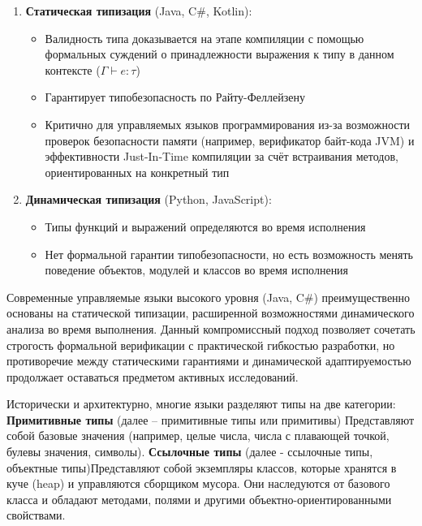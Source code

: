 \begin{enumerate}[label=\arabic*., leftmargin=*]
    \item \textbf{Статическая типизация} (Java, C\#, Kotlin):
    \begin{itemize}
        \item Валидность типа доказывается на этапе компиляции с помощью формальных суждений о принадлежности выражения к типу в данном контексте ($\Gamma \vdash e : \tau$)
        \item Гарантирует типобезопасность по Райту-Феллейзену
        \item Критично для управляемых языков программирования из-за возможности проверок безопасности памяти (например, верификатор байт-кода JVM) и эффективности Just-In-Time компиляции за счёт встраивания методов, ориентированных на конкретный тип
    \end{itemize}

    \item \textbf{Динамическая типизация} (Python, JavaScript):
    \begin{itemize}
        \item Типы функций и выражений определяются во время исполнения
        \item Нет формальной гарантии типобезопасности, но есть возможность менять поведение объектов, модулей и классов во время исполнения
    \end{itemize}
\end{enumerate}

Современные управляемые языки высокого уровня (Java, C\#) преимущественно основаны на статической типизации, расширенной возможностями динамического анализа во время выполнения. Данный компромиссный подход позволяет сочетать строгость формальной верификации с практической гибкостью разработки, но противоречие между статическими гарантиями и динамической адаптируемостью продолжает оставаться предметом активных исследований.

Исторически и архитектурно, многие языки разделяют типы на две категории:
\textbf{Примитивные типы} (далее -- примитивные типы или примитивы) Представляют собой базовые значения (например, целые числа, числа с плавающей точкой, булевы значения, символы).
\textbf{Ссылочные типы} (далее - ссылочные типы, объектные типы)Представляют собой экземпляры классов, которые хранятся в куче (heap) и управляются сборщиком мусора. Они наследуются от базового класса и обладают методами, полями и другими объектно-ориентированными свойствами.
\newpage


